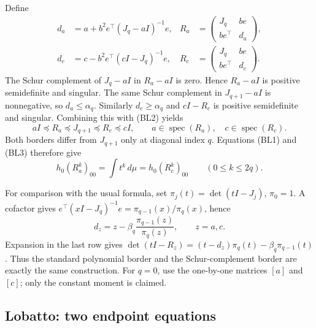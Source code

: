 \documentclass[11pt,a4paper]{article}
\theoremstyle{definition}
\begin{document}
Define
\begin{align*}
 d_a&=a+b^2 e^\top(J_q-aI)^{-1}e,&
 R_a&=\begin{pmatrix}J_q&b e\\b e^\top&d_a\end{pmatrix},\\
 d_c&=c-b^2 e^\top(cI-J_q)^{-1}e,&
 R_c&=\begin{pmatrix}J_q&b e\\b e^\top&d_c\end{pmatrix}.
\end{align*}
The Schur complement of $J_q-aI$ in $R_a-aI$ is zero. Hence
$R_a-aI$ is positive semidefinite and singular. The same Schur
complement in $J_{q+1}-aI$ is nonnegative, so $d_a\le\alpha_q$.
Similarly $d_c\ge\alpha_q$ and $cI-R_c$ is positive semidefinite
and singular. Combining this with (BL2) yields
\[
 aI\preceq R_a\preceq J_{q+1}\preceq R_c\preceq cI,
 \qquad a\in\operatorname{spec}(R_a),\quad
 c\in\operatorname{spec}(R_c).
 \tag{BL4}
\]
Both borders differ from $J_{q+1}$ only at diagonal index $q$.
Equations (BL1) and (BL3) therefore give
\[
 h_0(R_a^k)_{00}=\int t^k\,d\mu=h_0(R_c^k)_{00}
 \qquad(0\le k\le2q).
 \tag{BL5}
\]

For comparison with the usual formula, set
$\pi_j(t)=\det(tI-J_j)$, $\pi_0=1$.
A cofactor gives
$e^\top(xI-J_q)^{-1}e=\pi_{q-1}(x)/\pi_q(x)$, hence
\[
 d_z=z-\beta_q\frac{\pi_{q-1}(z)}{\pi_q(z)},\qquad z=a,c.
 \tag{BL6}
\]
Expansion in the last row gives
$\det(tI-R_z)=(t-d_z)\pi_q(t)-\beta_q\pi_{q-1}(t)$.
Thus the standard polynomial border and the Schur-complement border
are exactly the same construction.
For $q=0$, use the one-by-one matrices $[a]$ and $[c]$; only the
constant moment is claimed.

\subsection{Lobatto: two endpoint equations}
\end{document}
